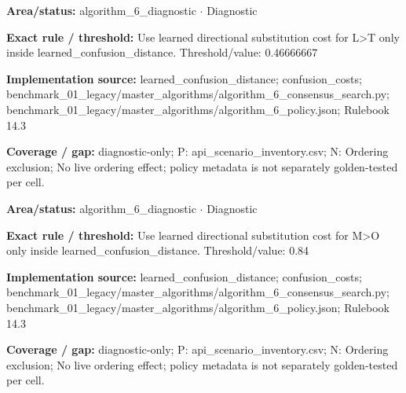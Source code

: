 \begin{tcolorbox}[enhanced,breakable,colback=white,colframe=Muted!45,boxrule=0.45pt,arc=1.5pt,left=6pt,right=6pt,top=5pt,bottom=5pt,title={\texttt{A6-LEARNED-SUBSTITUTION-L-T}},title after break={\texttt{A6-LEARNED-SUBSTITUTION-L-T}\ (continued)},fonttitle=\headingfont\bfseries\color{Navy},coltitle=Navy]
\textbf{Area/status:} algorithm\_\allowbreak{}6\_\allowbreak{}diagnostic $\boldsymbol{\cdot}$ Diagnostic\par
\smallskip
\textbf{Exact rule / threshold:} Use learned directional substitution cost for L>T only inside learned\_\allowbreak{}confusion\_\allowbreak{}distance. Threshold/\allowbreak{}value: 0.46666667\par
\smallskip
\textbf{Implementation source:} learned\_\allowbreak{}confusion\_\allowbreak{}distance; confusion\_\allowbreak{}costs; benchmark\_\allowbreak{}01\_\allowbreak{}legacy/\allowbreak{}master\_\allowbreak{}algorithms/\allowbreak{}algorithm\_\allowbreak{}6\_\allowbreak{}consensus\_\allowbreak{}search.py; benchmark\_\allowbreak{}01\_\allowbreak{}legacy/\allowbreak{}master\_\allowbreak{}algorithms/\allowbreak{}algorithm\_\allowbreak{}6\_\allowbreak{}policy.json; Rulebook 14.3\par
\smallskip
\textbf{Coverage / gap:} diagnostic-only; P: api\_\allowbreak{}scenario\_\allowbreak{}inventory.csv; N: Ordering exclusion; No live ordering effect; policy metadata is not separately golden-tested per cell.
\end{tcolorbox}
\begin{tcolorbox}[enhanced,breakable,colback=white,colframe=Muted!45,boxrule=0.45pt,arc=1.5pt,left=6pt,right=6pt,top=5pt,bottom=5pt,title={\texttt{A6-LEARNED-SUBSTITUTION-M-O}},title after break={\texttt{A6-LEARNED-SUBSTITUTION-M-O}\ (continued)},fonttitle=\headingfont\bfseries\color{Navy},coltitle=Navy]
\textbf{Area/status:} algorithm\_\allowbreak{}6\_\allowbreak{}diagnostic $\boldsymbol{\cdot}$ Diagnostic\par
\smallskip
\textbf{Exact rule / threshold:} Use learned directional substitution cost for M>O only inside learned\_\allowbreak{}confusion\_\allowbreak{}distance. Threshold/\allowbreak{}value: 0.84\par
\smallskip
\textbf{Implementation source:} learned\_\allowbreak{}confusion\_\allowbreak{}distance; confusion\_\allowbreak{}costs; benchmark\_\allowbreak{}01\_\allowbreak{}legacy/\allowbreak{}master\_\allowbreak{}algorithms/\allowbreak{}algorithm\_\allowbreak{}6\_\allowbreak{}consensus\_\allowbreak{}search.py; benchmark\_\allowbreak{}01\_\allowbreak{}legacy/\allowbreak{}master\_\allowbreak{}algorithms/\allowbreak{}algorithm\_\allowbreak{}6\_\allowbreak{}policy.json; Rulebook 14.3\par
\smallskip
\textbf{Coverage / gap:} diagnostic-only; P: api\_\allowbreak{}scenario\_\allowbreak{}inventory.csv; N: Ordering exclusion; No live ordering effect; policy metadata is not separately golden-tested per cell.
\end{tcolorbox}
